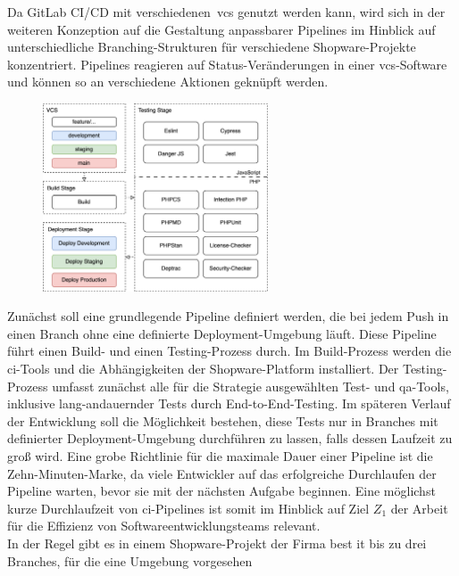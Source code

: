 Da GitLab CI/CD mit verschiedenen\ \acrshort{vcs} genutzt werden kann, wird sich in der weiteren Konzeption auf die
Gestaltung anpassbarer Pipelines im Hinblick auf unterschiedliche Branching-Strukturen für verschiedene
Shopware-Projekte konzentriert.
Pipelines reagieren auf Status-Veränderungen in einer \acrshort{vcs}-Software und können so an verschiedene
Aktionen geknüpft werden.
\begin{figure}
    \centering
    \includegraphics[width=0.595\textwidth]{images/content/ci-pipeline-concept}
    \label{fig:ci-pipeline-concept}
\end{figure}
Zunächst soll eine grundlegende Pipeline definiert werden, die bei jedem Push in einen Branch ohne eine definierte
Deployment-Umgebung läuft.
Diese Pipeline führt einen Build- und einen Testing-Prozess durch.
Im Build-Prozess werden die \acrshort{ci}-Tools und die Abhängigkeiten der Shopware-Platform installiert.
Der Testing-Prozess umfasst zunächst alle für die Strategie ausgewählten Test- und \acrshort{qa}-Tools, inklusive
lang-andauernder Tests durch End-to-End-Testing.
Im späteren Verlauf der Entwicklung soll die Möglichkeit bestehen, diese Tests nur in Branches mit definierter
Deployment-Umgebung durchführen zu lassen, falls dessen Laufzeit zu groß wird.
Eine grobe Richtlinie für die maximale Dauer einer Pipeline ist die Zehn-Minuten-Marke, da viele Entwickler
auf das erfolgreiche Durchlaufen der Pipeline warten, bevor sie mit der nächsten Aufgabe beginnen.
Eine möglichst kurze Durchlaufzeit von \acrshort{ci}-Pipelines ist somit im Hinblick auf Ziel $Z_1$ der Arbeit für die
Effizienz von Softwareentwicklungsteams relevant.\\
In der Regel gibt es in einem Shopware-Projekt der Firma best it bis zu drei Branches, für die eine Umgebung vorgesehen

